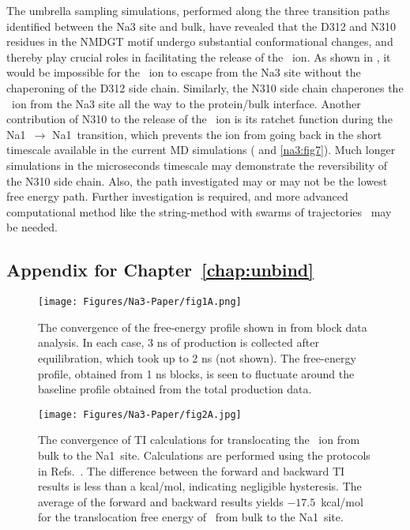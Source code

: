 The umbrella sampling simulations, performed along the three transition paths identified between 
the Na3 site and bulk, have revealed that the D312 and N310 residues in the NMDGT motif undergo 
substantial conformational changes, and thereby play crucial roles in facilitating the release of 
the \Na\ ion. As shown in  , it would be impossible for the \Na\ ion to escape from 
the Na3 site without the chaperoning of the D312 side chain. Similarly, the N310 side chain chaperones 
the \Na\ ion from the Na3 site all the way to the protein/bulk interface. Another contribution of N310 
to the release of the \Na\ ion is its ratchet function during the Na1\prim\ $\rightarrow$ Na1\dprim\ 
transition, which prevents the ion from going back in the short timescale available in the current 
MD simulations (\figrefs{na3:fig6} and \ref{na3:fig7}). Much longer simulations in the microseconds 
timescale may demonstrate the reversibility of the N310 side chain. Also, the path investigated may or 
may not be the lowest free energy path. Further investigation is required, and more advanced 
computational method like the string-method with swarms of trajectories~\cite{Gan2009} may be needed.

\pagebreak
\begin{subappendices}
{
\hypersetup{linkcolor=black}
\section{Appendix for Chapter~\ref*{chap:unbind}}
}


\begin{figure}[b!]
\centering
 \texttt{[image: Figures/Na3-Paper/fig1A.png]}
 \caption{The convergence of the free-energy profile shown in  from block 
          data analysis. In each case, 3 ns of production is collected after equilibration, 
          which took up to 2 ns (not shown). The free-energy profile, obtained from 1 ns 
          blocks, is seen to fluctuate around the baseline profile obtained from the total 
          production data.}
\label{na3:figs1}
\end{figure}

\begin{figure}[h!]
 \centering
 \texttt{[image: Figures/Na3-Paper/fig2A.jpg]}
  \caption{The convergence of TI calculations for translocating the \Na\ ion from 
           bulk to the Na1\dprim\ site. Calculations are performed using the 
           protocols in Refs.~\cite{Heinzelmann2011,Heinzelmann2013}. The difference 
           between the forward and backward TI results is less than a kcal/mol, 
           indicating negligible hysteresis. The average of the forward and backward 
           results yields $-17.5$~kcal/mol for the translocation free energy of 
           \Na\ from bulk to the Na1\dprim\ site.}
\label{na3:figs2}
\end{figure}

\end{subappendices}

